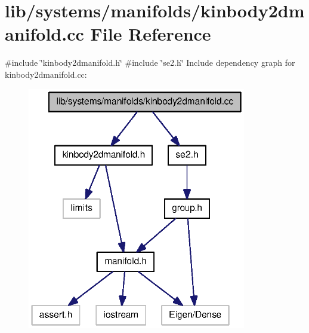 \section{lib/systems/manifolds/kinbody2dmanifold.cc \-File \-Reference}
\label{kinbody2dmanifold_8cc}
{\ttfamily \#include \char`\"{}kinbody2dmanifold.\-h\char`\"{}}\*
{\ttfamily \#include \char`\"{}se2.\-h\char`\"{}}\*
\-Include dependency graph for kinbody2dmanifold.\-cc\-:\nopagebreak
\begin{figure}[H]
\begin{center}
\leavevmode
\includegraphics[width=271pt]{kinbody2dmanifold_8cc__incl}
\end{center}
\end{figure}
